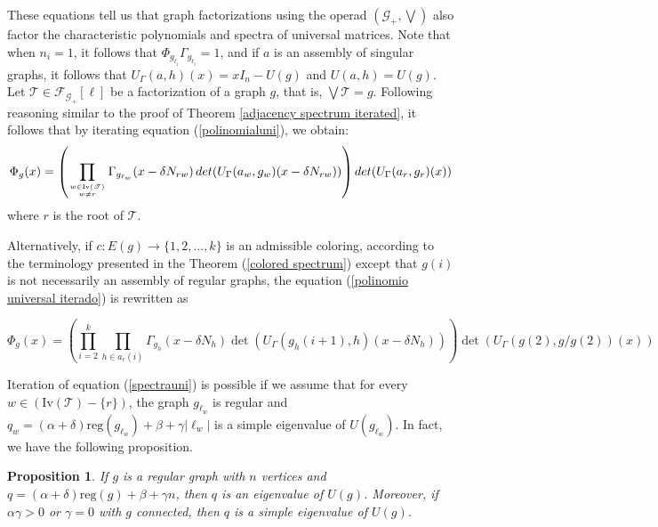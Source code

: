 \documentclass[11pt]{article}
\newtheorem{proposition}[theorem]{Proposition}
\theoremstyle{definition}
\begin{document}
These equations tell us that graph factorizations using the operad $(\mathscr{G}_+, \bigvee)$ also factor the characteristic polynomials and spectra of universal matrices. Note that when $n_i=1$, it follows that $\Phi_{g_{\ell_i}}\Gamma_{g_{\ell_i}}=1$, and if $a$ is an assembly of singular graphs, it follows that $U_{\Gamma}(a, h)(x)=xI_n-U(g)$ and $U(a,h)=U(g)$. Let $\mathscr{T}\in \mathscr{F}_{\mathscr{G}_+}[\ell]$ be a factorization of a graph $g$, that is, $\displaystyle{\bigvee \mathscr{T}}=g$. Following reasoning similar to the proof of Theorem \ref{adjacency spectrum iterated}, it follows that by iterating equation (\ref{polinomialuni}), we obtain:
\begin{equation}\label{polinomio universal iterado}
    \Phi_g(x)=\left(\prod_{w\in \mathrm{Iv}(\mathscr{T})\atop w\neq r} \Gamma_{g_{\ell_w}}(x-\delta N_{rw})\,det(U_{\Gamma}(a_w, g_w)(x-\delta N_{rw}))\right)det(U_{\Gamma}(a_r, g_r)(x))
\end{equation}
where $r$ is the root of $\mathscr{T}$.

Alternatively, if $c:E(g)\longrightarrow \{1, 2,..., k\}$ is an admissible coloring, according to the terminology presented in the Theorem (\ref{colored spectrum}) except that $g(i)$ is not necessarily an assembly of regular graphs, the equation (\ref{polinomio universal iterado}) is rewritten as

\begin{equation}\label{universal colored polynomial}
 \Phi_g(x)=\left(\prod^k_{i=2} \prod_{h\in a_c(i)}\Gamma_{g_h}(x-\delta N_h) \det(U_{\Gamma}(g_h(i+1), h)(x-\delta N_h))\right)\det(U_{\Gamma}(g(2), g/g(2))(x))
\end{equation}

Iteration of equation (\ref{spectrauni}) is possible if we assume that for every $w\in (\mathrm{Iv}(\mathscr{T})-\{r\})$, the graph $g_{\ell_w}$ is regular and $q_w=(\alpha+\delta)\mathrm{reg}(g_{\ell_w})+\beta+\gamma |\ell_w|$ is a simple eigenvalue of $U(g_{\ell_w})$. In fact, we have the following proposition.

\begin{proposition}\label{autprin} If $g$ is a regular graph with $n$ vertices and $q=(\alpha+\delta)\mathrm{reg}(g)+\beta+\gamma n$, then $q$ is an eigenvalue of $U(g)$. Moreover, if $\alpha \gamma >0$ or $\gamma=0$ with $g$ connected, then $q$ is a simple eigenvalue of $U(g)$.
\end{proposition}
\end{document}
